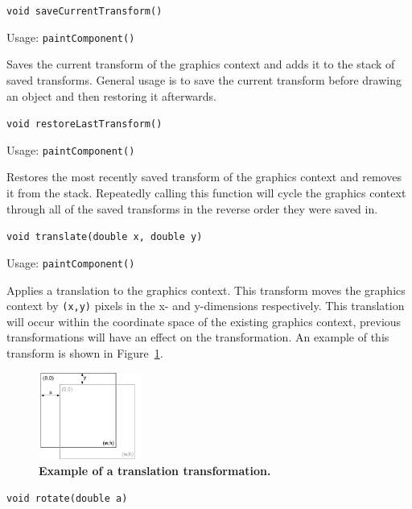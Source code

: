 \documentclass[a4paper, 10pt]{report}
\begin{document}
\hrulefill

{\large {\tt void saveCurrentTransform()}}

Usage: {\tt paintComponent()}

Saves the current transform of the graphics context and adds it to the stack of saved transforms. General usage is to save the current transform before drawing an object and then restoring it afterwards.

\hrulefill

{\large {\tt void restoreLastTransform()}}

Usage: {\tt paintComponent()}

Restores the most recently saved transform of the graphics context and removes it from the stack. Repeatedly calling this function will cycle the graphics context through all of the saved transforms in the reverse order they were saved in.

\hrulefill

{\large {\tt void translate(double x, double y)}}

Usage: {\tt paintComponent()}

Applies a translation to the graphics context. This transform moves the graphics context by {\tt (x,y)} pixels in the x- and y-dimensions respectively. This translation will occur within the coordinate space of the existing graphics context, previous transformations will have an effect on the transformation. An example of this transform is shown in Figure~\ref{fig:Translate}.

\begin{figure}[htbp]
\begin{center}
\includegraphics[width=0.3\textwidth]{translation}
\caption{{\bf Example of a translation transformation.}}
\label{fig:Translate}
\end{center}
\end{figure}

\hrulefill

{\large {\tt void rotate(double a)}}
\end{document}
